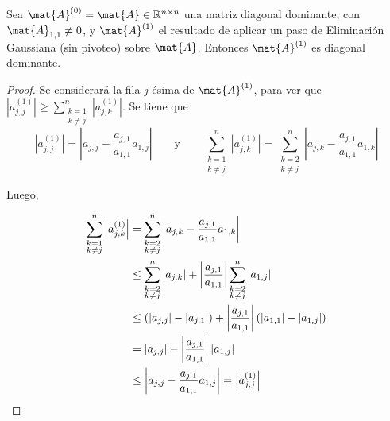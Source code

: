         \begin{lema}
            \label{lema:EG conserva diagonal dominante}
            Sea $\mat{A}^{(0)} = \mat{A} \in \mathbb{R}^{n \times n}$ una matriz diagonal dominante, con $\mat{A}_{1,1} \neq 0$, y $\mat{A}^{(1)}$ el resultado de aplicar un paso de Eliminación Gaussiana (sin pivoteo) sobre $\mat{A}$. Entonces $\mat{A}^{(1)}$ es diagonal dominante.
        \end{lema}
        \begin{proof}
            Se considerará la fila $j$-ésima de $\mat{A}^{(1)}$, para ver que $\left \vert a^{(1)}_{j,j} \right \vert \geq \sum_{\substack{k = 1 \\ k \neq j}}^n \left \vert a^{(1)}_{j,k} \right \vert$. Se tiene que
            \[ \left \vert a^{(1)}_{j,j} \right \vert = \left \vert a_{j,j} - \frac{a_{j,1}}{a_{1,1}} a_{1,j} \right \vert
                \qquad \text{y} \qquad
            \sum_{\substack{k = 1 \\ k \neq j}}^n \left \vert a^{(1)}_{j,k} \right \vert
                = \sum_{\substack{k = 2 \\ k \neq j}}^n \left \vert a_{j,k} - \frac{a_{j,1}}{a_{1,1}} a_{1,k} \right \vert \]

            Luego,

            \[ \begin{split}
                \sum_{\substack{k = 1 \\ k \neq j}}^n \left \vert a^{(1)}_{j,k} \right \vert
                &= \sum_{\substack{k = 2 \\ k \neq j}}^n \left \vert a_{j,k} - \frac{a_{j,1}}{a_{1,1}} a_{1,k} \right \vert \\
                &\leq \sum_{\substack{k = 2 \\ k \neq j}}^n \vert a_{j,k} \vert + \left \vert \frac{a_{j,1}}{a_{1,1}} \right \vert \sum_{\substack{k = 2 \\ k \neq j}}^n \vert a_{1,j} \vert \\
                &\leq \left( \vert a_{j,j} \vert - \vert a_{j,1} \vert \right) + \left \vert \frac{a_{j,1}}{a_{1,1}} \right \vert \left( \vert a_{1,1} \vert - \vert a_{1,j} \vert \right) \\
                &= \vert a_{j,j} \vert - \left \vert \frac{a_{j,1}}{a_{1,1}} \right \vert \vert a_{1,j} \vert \\
                &\leq \left \vert a_{j,j} -  \frac{a_{j,1}}{a_{1,1}} a_{1,j} \right \vert = \left \vert a^{(1)}_{j,j} \right \vert \qedhere
            \end{split} \]
        \end{proof}

